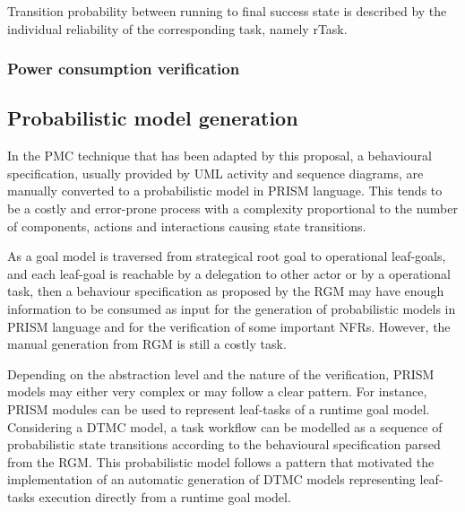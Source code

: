 Transition probability between running to final success state is described by the individual reliability of the corresponding task, namely rTask. 

\subsubsection{Power consumption verification}



\subsection{Probabilistic model generation}

In the PMC technique that has been adapted by this proposal, a behavioural specification, usually provided by UML activity and sequence diagrams, are manually converted to a probabilistic model in PRISM language. This tends to be a costly and error-prone process with a complexity proportional to the number of components, actions and interactions causing state transitions.  

As a goal model is traversed from strategical root goal to operational leaf-goals, and each leaf-goal is reachable by a delegation to other actor or by a operational task, then a behaviour specification as proposed by the RGM may have enough information to be consumed as input for the generation of probabilistic models in PRISM language and for the verification of some important NFRs. However, the manual generation from RGM is still a costly task.

Depending on the abstraction level and the nature of the verification, PRISM models may either very complex or may follow a clear pattern. For instance, PRISM modules can be used to represent leaf-tasks of a runtime goal model. Considering a DTMC model, a task workflow can be modelled as a sequence of probabilistic state transitions according to the behavioural specification parsed from the RGM. This probabilistic model follows a pattern that motivated the implementation of an automatic generation of DTMC models representing leaf-tasks execution directly from a runtime goal model.

